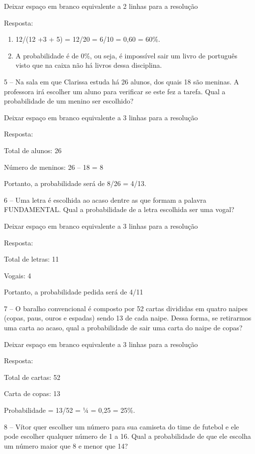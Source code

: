 Deixar espaço em branco equivalente a 2 linhas para a resolução

Resposta:

\begin{enumerate}
\def\labelenumi{\alph{enumi})}
\item
  12/(12 +3 + 5) = 12/20 = 6/10 = 0,60 = 60\%.
\item
  A probabilidade é de 0\%, ou seja, é impossível sair um livro de
  português visto que na caixa não há livros dessa disciplina.
\end{enumerate}

5 -- Na sala em que Clarissa estuda há 26 alunos, dos quais 18 são
meninas. A professora irá escolher um aluno para verificar se este fez a
tarefa. Qual a probabilidade de um menino ser escolhido?

Deixar espaço em branco equivalente a 3 linhas para a resolução

Resposta:

Total de alunos: 26

Número de meninos: 26 -- 18 = 8

Portanto, a probabilidade será de 8/26 = 4/13.

6 -- Uma letra é escolhida ao acaso dentre as que formam a palavra
FUNDAMENTAL. Qual a probabilidade de a letra escolhida ser uma vogal?

Deixar espaço em branco equivalente a 3 linhas para a resolução

Resposta:

Total de letras: 11

Vogais: 4

Portanto, a probabilidade pedida será de 4/11

7 -- O baralho convencional é composto por 52 cartas divididas em quatro
naipes (copas, paus, ouros e espadas) sendo 13 de cada naipe. Dessa
forma, se retirarmos uma carta ao acaso, qual a probabilidade de sair
uma carta do naipe de copas?

Deixar espaço em branco equivalente a 3 linhas para a resolução

Resposta:

Total de cartas: 52

Carta de copas: 13

Probabilidade = 13/52 = ¼ = 0,25 = 25\%.

8 -- Vítor quer escolher um número para sua camiseta do time de futebol
e ele pode escolher qualquer número de 1 a 16. Qual a probabilidade de
que ele escolha um número maior que 8 e menor que 14?

